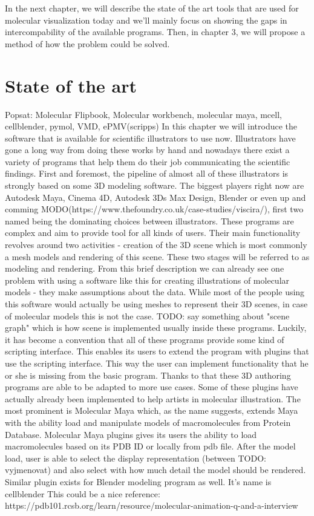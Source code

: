 \documentclass[
  digital, %
  table,   %
  lof,     %
  lot,     %
]{fithesis3}
\begin{document}
In the next chapter, we will describe the state of the art tools that are used for molecular visualization today and we'll mainly focus on showing the gaps in intercompability of the available programs. Then, in chapter 3, we will propose a method of how the problem could be solved.

\chapter{State of the art}
Popsat: Molecular Flipbook, Molecular workbench, molecular maya, mcell, cellblender, pymol, VMD, ePMV(scripps)
In this chapter we will introduce the software that is available for scientific illustrators to use now. Illustrators have gone a long way from doing these works by hand and nowadays there exist a variety of programs that help them do their job communicating the scientific findings.
First and foremost, the pipeline of almost all of these illustrators is strongly based on some 3D modeling software. The biggest players right now are Autodesk Maya, Cinema 4D, Autodesk 3Ds Max Design, Blender or even up and comming MODO(https://www.thefoundry.co.uk/case-studies/viscira/), first two named being the dominating choices between illustrators. These programs are complex and aim to provide tool for all kinds of users. Their main functionality revolves around two activities - creation of the 3D scene which is most commonly a mesh models and rendering of this scene. These two stages will be referred to as modeling and rendering. From this brief description we can already see one problem with using a software like this for creating illustrations of molecular models - they make assumptions about the data. While most of the people using this software would actually be using meshes to represent their 3D scenes, in case of molecular models this is not the case. TODO: say something about "scene graph" which is how scene is implemented usually inside these programs.
Luckily, it has become a convention that all of these programs provide some kind of scripting interface. This enables its users to extend the program with plugins that use the scripting interface. This way the user can implement functionality that he or she is missing from the basic program. Thanks to that these 3D authoring programs are able to be adapted to more use cases.
Some of these plugins have actually already been implemented to help artists in molecular illustration. The most prominent is Molecular Maya which, as the name suggests, extends Maya with the ability load and manipulate models of macromolecules from Protein Database. Molecular Maya plugins gives its users the ability to load macromolecules based on its PDB ID or locally from pdb file. After the model load, user is able to select the display representation (between TODO: vyjmenovat) and also select with how much detail the model should be rendered.
Similar plugin exists for Blender modeling program as well. It's name is cellblender
This could be a nice reference: https://pdb101.rcsb.org/learn/resource/molecular-animation-q-and-a-interview
\end{document}

